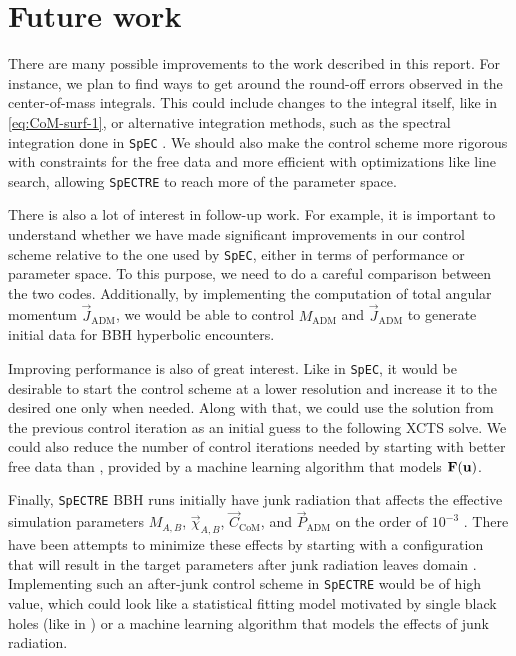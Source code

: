 \documentclass{../document}
\begin{document}
  \section{Future work}

    There are many possible improvements to the work described in this report. For instance, we plan to find ways to get around the round-off errors observed in the center-of-mass integrals. This could include changes to the integral itself, like in \eq\eqref{eq:CoM-surf-1}, or alternative integration methods, such as the spectral integration done in {\tt SpEC} \cite{Serguei}. We should also make the control scheme more rigorous with constraints for the free data and more efficient with optimizations like line search, allowing {\tt SpECTRE} to reach more of the parameter space.

    There is also a lot of interest in follow-up work. For example, it is important to understand whether we have made significant improvements in our control scheme relative to the one used by {\tt SpEC}, either in terms of performance or parameter space. To this purpose, we need to do a careful comparison between the two codes. Additionally, by implementing the computation of total angular momentum $\vec J_\text{ADM}$, we would be able to control $M_\text{ADM}$ and $\vec J_\text{ADM}$ to generate initial data for BBH hyperbolic encounters.

    Improving performance is also of great interest. Like in {\tt SpEC}, it would be desirable to start the control scheme at a lower resolution and increase it to the desired one only when needed. Along with that, we could use the solution from the previous control iteration as an initial guess to the following XCTS solve. We could also reduce the number of control iterations needed by starting with better free data than \eq{\eqref{eq:u0}}, provided by a machine learning algorithm that models ${\bf F}({\bf u})$.

    Finally, {\tt SpECTRE} BBH runs initially have junk radiation that affects the effective simulation parameters $M_{A,B}$, $\vec \chi_{A,B}$, $\vec C_\text{CoM}$, and $\vec P_\text{ADM}$ on the order of $10^{-3}$ \cite{Serguei}. There have been attempts to minimize these effects by starting with a configuration that will result in the target parameters after junk radiation leaves domain \cite{Higginbotham:2019}. Implementing such an after-junk control scheme in {\tt SpECTRE} would be of high value, which could look like a statistical fitting model motivated by single black holes (like in \cite{Higginbotham:2019}) or a machine learning algorithm that models the effects of junk radiation.
\end{document}
